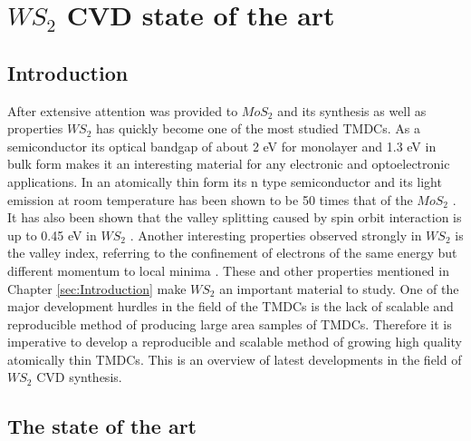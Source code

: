 \chapter{$WS_2$ CVD state of the art}

\section{Introduction}
After extensive attention was provided to $MoS_2$ and its synthesis as well as properties $WS_2$ has quickly become one of the most studied TMDCs. As a semiconductor its optical bandgap of about 2 eV for monolayer and 1.3 eV in bulk form makes it an interesting material for any electronic and optoelectronic applications. In an atomically thin form its n type semiconductor \cite{ExtraordinaryRoomTemperaturePhotoluminescenceInTriangularWS2Monolayers}\cite{doi:10.1021/nn5059908}\cite{Iqbal2015} and its light emission at room temperature has been shown to be 50 times that of the $MoS_2$ \cite{doi:10.1021/nn4046002}. It has also been shown that the valley splitting caused by spin orbit interaction is up to 0.45 eV in $WS_2$ \cite{GiantSpin-orbit-inducedSpinSplittingInTwo-dimensionalTransition-metalDichalcogenideSemiconductors}. Another interesting properties observed strongly in $WS_2$ is the valley index, referring to the confinement of electrons of the same energy but different momentum to local minima \cite{ElectronicsAndOptoelectronicsOfTwo-dimensionalTransitionMetalDichalcogenides}. These and other properties mentioned in Chapter \ref{sec:Introduction} make $WS_2$ an important material to study. One of the major development hurdles in the field of the TMDCs is the lack of scalable and reproducible method of producing large area samples of TMDCs. Therefore it is imperative to develop a reproducible and scalable method of growing high quality atomically thin TMDCs. This is an overview of latest developments in the field of $WS_2$ CVD synthesis.

\section{The state of the art}
